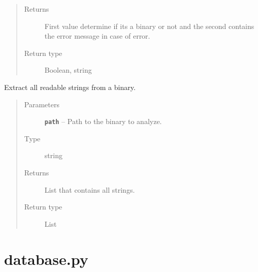 \documentclass[letterpaper,10pt,oneside]{sphinxmanual}
\begin{document}
\begin{fulllineitems}
\begin{fulllineitems}
\begin{quote}
\begin{description}
\item[{Returns}] \leavevmode
First value determine if its a binary or not and the second
contains the error message in case of error.

\item[{Return type}] \leavevmode
Boolean, string

\end{description}\end{quote}

\end{fulllineitems}


\begin{fulllineitems}
\label{index:lib.parser.Parser.strings}
Extract all readable strings from a binary.
\begin{quote}\begin{description}
\item[{Parameters}] \leavevmode
\textbf{\texttt{path}} -- Path to the binary to analyze.

\item[{Type}] \leavevmode
string

\item[{Returns}] \leavevmode
List that contains all strings.

\item[{Return type}] \leavevmode
List

\end{description}\end{quote}

\end{fulllineitems}


\end{fulllineitems}



\section{database.py}
\label{index:database-py}\label{index:module-lib.database}
\end{document}
